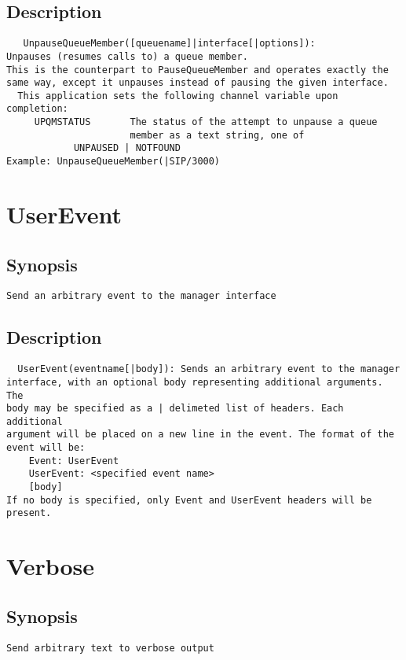 \subsection{Description}
\begin{verbatim}
   UnpauseQueueMember([queuename]|interface[|options]):
Unpauses (resumes calls to) a queue member.
This is the counterpart to PauseQueueMember and operates exactly the
same way, except it unpauses instead of pausing the given interface.
  This application sets the following channel variable upon completion:
     UPQMSTATUS       The status of the attempt to unpause a queue 
                      member as a text string, one of
            UNPAUSED | NOTFOUND
Example: UnpauseQueueMember(|SIP/3000)

\end{verbatim}


\section{UserEvent}
\subsection{Synopsis}
\begin{verbatim}
Send an arbitrary event to the manager interface
\end{verbatim}
\subsection{Description}
\begin{verbatim}
  UserEvent(eventname[|body]): Sends an arbitrary event to the manager
interface, with an optional body representing additional arguments.  The
body may be specified as a | delimeted list of headers. Each additional
argument will be placed on a new line in the event. The format of the
event will be:
    Event: UserEvent
    UserEvent: <specified event name>
    [body]
If no body is specified, only Event and UserEvent headers will be present.

\end{verbatim}


\section{Verbose}
\subsection{Synopsis}
\begin{verbatim}
Send arbitrary text to verbose output
\end{verbatim}
